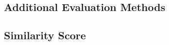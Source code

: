 \subsection{Additional Evaluation Methods}
\label{ch:preliminaries-evaluationOfSyntheticTabularData-otherMetrics}


\subsection{Similarity Score}
\label{ch:preliminaries-evaluationOfSyntheticTabularData-similarityScore}






